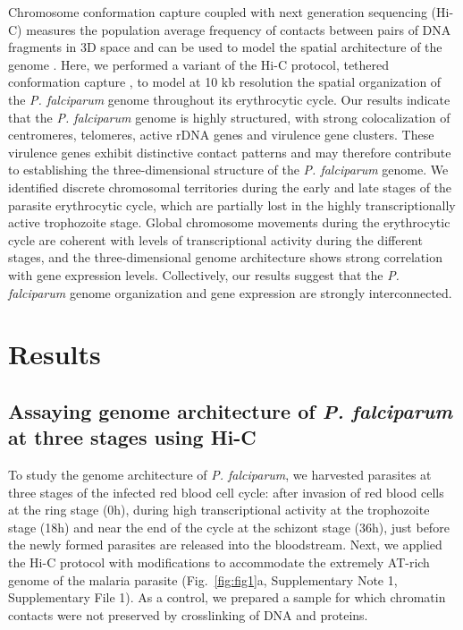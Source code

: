 Chromosome conformation capture coupled with next generation sequencing (Hi-C) measures the population average frequency of contacts between pairs of DNA fragments in 3D space and can be used to model the spatial architecture of the genome \citep{lieberman-aiden:comprehensive, duan:three, kalhor:genome}. Here, we performed a variant of the Hi-C protocol, tethered conformation capture \citep{kalhor:genome}, to model at 10 kb resolution the spatial organization of the {\em P. falciparum} genome throughout its erythrocytic cycle. Our results indicate that the {\em P. falciparum} genome is highly structured, with strong colocalization of centromeres, telomeres, active rDNA genes and virulence gene clusters. These virulence genes exhibit distinctive contact patterns and may therefore contribute to establishing the three-dimensional structure of the {\em P. falciparum} genome. We identified discrete chromosomal territories during the early and late stages of the parasite erythrocytic cycle, which are partially lost in the highly transcriptionally active trophozoite stage. Global chromosome movements during the erythrocytic cycle are coherent with levels of transcriptional activity during the different stages, and the three-dimensional genome architecture shows strong correlation with gene expression levels. Collectively, our results suggest that the {\em P. falciparum} genome organization and gene expression are strongly interconnected.

\section*{Results}
\subsection*{Assaying genome architecture of {\em P. falciparum} at three stages using Hi-C}

To study the genome architecture of {\em P. falciparum}, we harvested parasites at three stages of the infected red blood cell cycle: after invasion of red blood cells at the ring stage (0h), during high transcriptional activity at the trophozoite stage (18h) and near the end of the cycle at the schizont stage (36h), just before the newly formed parasites are released into the bloodstream. Next, we applied the Hi-C protocol \citep{kalhor:genome} with modifications to accommodate the extremely AT-rich genome of the malaria parasite (Fig.~\ref{fig:fig1}a, Supplementary Note 1, Supplementary File 1). As a control, we prepared a sample for which chromatin contacts were not preserved by crosslinking of DNA and proteins.

